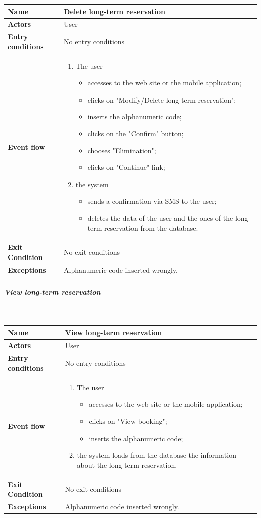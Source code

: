 \begin{tabular}{l l}
 \textbf {Name} & Delete long-term reservation  \\ \hline
 \textbf{Actors} & User \\ \hline
 \textbf{Entry conditions} & No entry conditions \\ \hline
 \textbf{Event flow} & 
 \parbox{0.7\textwidth}{
 \begin{enumerate}
 \item The user
 \begin{itemize}
 \item accesses to the web site or the mobile application;
 \item clicks on "Modify/Delete long-term reservation";
 \item inserts the alphanumeric code;
 \item clicks on the "Confirm" button;
 \item chooses "Elimination";
 \item clicks on "Continue" link;
 \end{itemize}
 \item the system
 \begin{itemize}
 \item sends a confirmation via SMS to the user;
 \item deletes the data of the user and the ones of the long-term reservation from the database.
 \end{itemize}
 \end{enumerate}
 } \\ \hline
 \textbf{Exit Condition} & No exit conditions \\ \hline
 \textbf{Exceptions} & Alphanumeric code inserted wrongly.
\end{tabular}
\newpage
\subparagraph{View long-term reservation}
~\\[0.2cm]
\vspace{20pt}
\noindent
\begin{tabular}{l l}
 \textbf {Name} & View long-term reservation  \\ \hline
 \textbf{Actors} & User \\ \hline
 \textbf{Entry conditions} & No entry conditions \\ \hline
 \textbf{Event flow} & 
 \parbox{0.7\textwidth}{
 \begin{enumerate}
 \item The user
 \begin{itemize}
 \item accesses to the web site or the mobile application;
 \item clicks on "View booking";
 \item inserts the alphanumeric code;
 \end{itemize}
 \item the system loads from the database the information about the long-term reservation.
 \end{enumerate}
 } \\ \hline
 \textbf{Exit Condition} & No exit conditions \\ \hline
 \textbf{Exceptions} & Alphanumeric code inserted wrongly.
\end{tabular}

